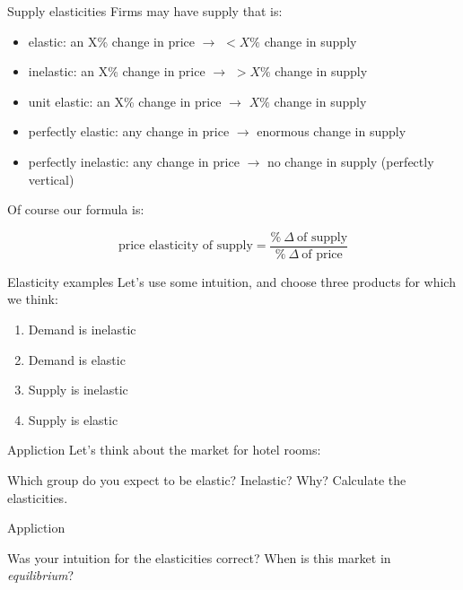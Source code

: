 \documentclass[aspectratio=169]{beamer}
\begin{document}
 \begin{frame}{Supply elasticities}
    Firms may have supply that is:
    \begin{itemize}
        \item elastic: an X\% change in price $\to$ $<X\%$ change in supply
        \item inelastic: an X\% change in price $\to$ $>X\%$ change in supply
        \item unit elastic: an X\% change in price $\to$ $X\%$ change in supply
        \item perfectly elastic: any change in price $\to$ enormous change in supply
        \item perfectly inelastic: any change in price $\to$ no change in supply (perfectly vertical)
    \end{itemize}

    Of course our formula is:

    $$
    \text{price elasticity of supply} = \dfrac{\%~\Delta~\text{of supply}}{\%~\Delta~\text{of price}}
    $$

 \end{frame}

 \begin{frame}{Elasticity examples}
    Let's use some intuition, and choose three products for which we think:
    \begin{enumerate}
        \item Demand is inelastic
        \item Demand is elastic
        \item Supply is inelastic
        \item Supply is elastic
    \end{enumerate}
 \end{frame}

 \begin{frame}{Appliction}
    Let's think about the market for hotel rooms:
    
    Which group do you expect to be elastic? Inelastic? Why?
    \medskip
    Calculate the elasticities.
 \end{frame}

 \begin{frame}{Appliction}
    
    Was your intuition for the elasticities correct?
    \medskip
    When is this market in \textit{equilibrium}?
 \end{frame}


\end{document}
